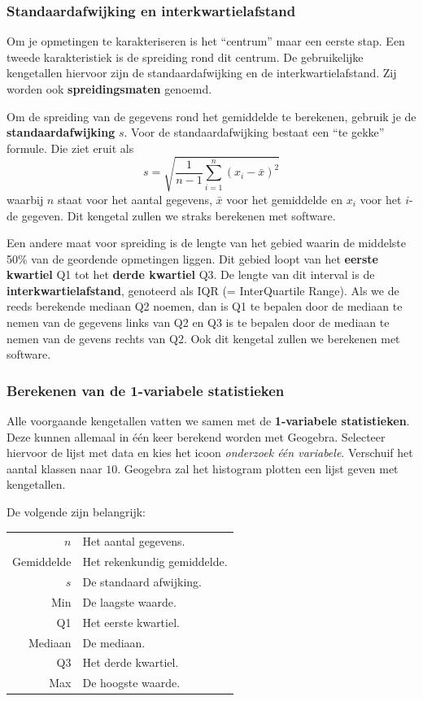 \documentclass[12pt,twoside]{article}
\begin{document}
\subsubsection*{Standaardafwijking en interkwartielafstand}

Om je opmetingen te karakteriseren is het “centrum” maar een eerste stap. Een tweede karakteristiek
is de spreiding rond dit centrum. De gebruikelijke kengetallen hiervoor zijn de standaardafwijking en
de interkwartielafstand. Zij worden ook {\bf spreidingsmaten} genoemd.

Om de spreiding van de gegevens rond het gemiddelde te berekenen, gebruik je de
{\bf standaardafwijking} $s$. Voor de standaardafwijking bestaat een “te gekke” formule. Die ziet eruit als
$$
s = \sqrt{\frac{1}{n-1}\sum^n_{i=1}(x_i - \bar{x})^2}
$$
waarbij $n$ staat voor het aantal gegevens, $\bar{x}$ voor het gemiddelde en $x_i$ voor het $i$-de gegeven. Dit kengetal zullen we straks berekenen met software.

Een andere maat voor spreiding is de lengte van het gebied waarin de middelste 50\% van de
geordende opmetingen liggen. Dit gebied loopt van het {\bf eerste kwartiel} Q1 tot het {\bf derde kwartiel} Q3.
De lengte van dit interval is de {\bf interkwartielafstand}, genoteerd als IQR (= InterQuartile Range).
Als we de reeds berekende mediaan Q2 noemen, dan is Q1 te bepalen door de mediaan te nemen van de
gegevens links van Q2 en Q3 is te bepalen door de mediaan te nemen van de gevens rechts van Q2. Ook
dit kengetal zullen we berekenen met software.

\subsubsection{Berekenen van de 1-variabele statistieken}

Alle voorgaande kengetallen vatten we samen met de {\bf 1-variabele statistieken}. Deze kunnen allemaal
in één keer berekend worden met Geogebra. Selecteer hiervoor de lijst met data en kies het icoon 
{\it onderzoek één variabele}. Verschuif het aantal klassen naar $10$. Geogebra zal het histogram plotten
een lijst geven met kengetallen.

De volgende zijn belangrijk:
\begin{center}
  \begin{tabular}{r|l}
    $n$ & Het aantal gegevens.\\
    Gemiddelde & Het rekenkundig gemiddelde.\\
    $s$ & De standaard afwijking.\\
    Min & De laagste waarde.\\
    Q1 & Het eerste kwartiel.\\
    Mediaan & De mediaan.\\
    Q3 & Het derde kwartiel.\\
    Max & De hoogste waarde.\\
  \end{tabular}
\end{center}
\end{document}
